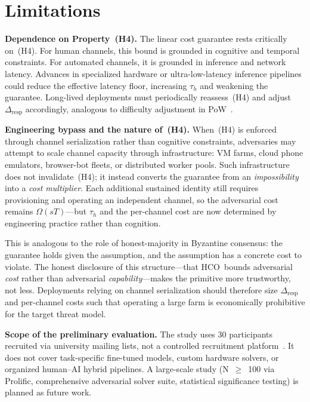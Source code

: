 \documentclass[11pt]{article}
\newcommand{\HCO}{HCO\xspace}
\theoremstyle{remark}
\theoremstyle{plain}
\begin{document}
	
	\section{Limitations}
	\label{sec:limitations}
	
	\noindent\textbf{Dependence on Property~(H4).}
	The linear cost guarantee rests critically on~(H4). For human channels,
	this bound is grounded in cognitive and temporal constraints. For
	automated channels, it is grounded in inference and network latency.
	Advances in specialized hardware or ultra-low-latency inference pipelines
	could reduce the effective latency floor, increasing $\tau_h$ and
	weakening the guarantee. Long-lived deployments must periodically
	reassess~(H4) and adjust $\Delta_{\mathrm{resp}}$ accordingly, analogous
	to difficulty adjustment in PoW~\cite{nakamoto2008bitcoin}.
	
	\noindent\textbf{Engineering bypass and the nature of~(H4).}
	When~(H4) is enforced through channel serialization rather than
	cognitive constraints, adversaries may attempt to scale channel capacity
	through infrastructure: VM farms, cloud phone emulators, browser-bot
	fleets, or distributed worker pools. Such infrastructure does not
	invalidate~(H4); it instead converts the guarantee from an
	\emph{impossibility} into a \emph{cost multiplier}. Each additional
	sustained identity still requires provisioning and operating an
	independent channel, so the adversarial cost remains $\Omega(sT)$---but
	$\tau_h$ and the per-channel cost are now determined by engineering
	practice rather than cognition.
	
	This is analogous to the role of honest-majority in Byzantine consensus:
	the guarantee holds given the assumption, and the assumption has a
	concrete cost to violate. The honest disclosure of this structure---that
	\HCO\ bounds adversarial \emph{cost} rather than adversarial
	\emph{capability}---makes the primitive more trustworthy, not less.
	Deployments relying on channel serialization should therefore size
	$\Delta_{\mathrm{resp}}$ and per-channel costs such that operating a
	large farm is economically prohibitive for the target threat model.
	
	\noindent\textbf{Scope of the preliminary evaluation.}
	The study uses 30 participants recruited via university mailing lists,
	not a controlled recruitment platform~\cite{prolific2014,peer2022data}.
	It does not cover task-specific fine-tuned models, custom hardware
	solvers, or organized human--AI hybrid pipelines. A large-scale study
	(N~$\geq$~100 via Prolific, comprehensive adversarial solver suite,
	statistical significance testing) is planned as future work.
	
\end{document}
